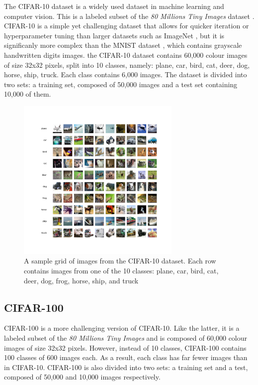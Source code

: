 The CIFAR-10 dataset \cite{CIFARdataset} is a widely
used dataset in machine learning and computer vision. This is a labeled subset
of the \emph{80 Millions Tiny Images} dataset \cite{4531741}. CIFAR-10 is a
simple yet challenging dataset that allows for quicker iteration or
hyperparameter tuning than larger datasets such as ImageNet
\cite{DBLP:journals/ijcv/RussakovskyDSKS15}, but it is significanly more complex
than the MNIST dataset \cite{6296535}, which contains grayscale handwritten
digits images. the CIFAR-10 dataset contains 60,000 colour images of size 32x32
pixels, split into 10 classes, namely: plane, car, bird, cat, deer, dog, horse,
ship, truck. Each class contains 6,000 images. The dataset is divided into two
sets: a training set, composed of 50,000 images and a test set containing 10,000
of them.\\

\begin{figure}[ht!]
  \centering
  \includegraphics[width=0.7\textwidth]{chapter_dlo/assets/cifar-10_example.png}
  \caption{ A sample grid of images from the CIFAR-10 dataset. Each row
    contains images from one of the 10 classes: plane, car, bird, cat,
    deer, dog, frog, horse, ship, and truck}
  \label{fig:intro:cifar10_examples}
\end{figure}


\subsection{CIFAR-100}

CIFAR-100 \cite{CIFARdataset} is a more challenging
version of CIFAR-10. Like the latter, it is a labeled subset of the \emph{80
  Millions Tiny Images} and  is composed of 60,000 colour images of size 32x32
pixels. However, instead of 10 classes, CIFAR-100 contains 100 classes of 600
images each. As a result, each class has far fewer images than in CIFAR-10.
CIFAR-100 is also divided into two sets: a training set and a test, composed of
50,000 and 10,000 images respectively.\\

